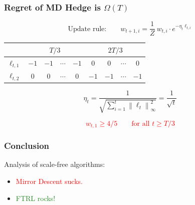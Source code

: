 \documentclass[usenames,dvipsnames]{beamer}
\newcommand{\norm}[1]{\left\|#1\right\|}
\begin{document}
\begin{frame}
\frametitle{Regret of MD Hedge is $\Omega(T)$}

$$
\text{Update rule:} \qquad w_{t+1,i} = \frac{1}{Z} \ w_{t,i} \cdot e^{-\eta_t \ell_{t,i}}
$$

\pause
\vspace{1cm}

\begin{tabular}{|c|c|c|c|c|c|c|c|c|}
\hline
&  \multicolumn{4}{|c}{$T/3$} & \multicolumn{4}{|c|}{$2T/3$} \\
\hline
$\ell_{t,1}$ & $-1$ & $-1$ & $\cdots$ & $-1$ & $0$ & $0$ & $\cdots$ & $0$ \\
\hline
$\ell_{t,2}$ & $0$ & $0$ & $\cdots$ & $0$ & $-1$ & $-1$ & $\cdots$ & $-1$ \\
\hline
\end{tabular}

\pause
\vspace{1cm}

$$
\eta_t = \frac{1}{\sqrt{\sum_{i=1}^t \norm{\ell_t}_\infty^2}} = \frac{1}{\sqrt{t}}
$$

\pause
\vspace{1cm}

\textcolor{red}{
$$
w_{t,1} \ge 4/5 \qquad \text{for all $t \ge T/3$}
$$
}

\end{frame}

\begin{frame}
\frametitle{Conclusion}

\Large

Analysis of scale-free algorithms:
\vspace{1cm}

\begin{itemize}
\item \textcolor{red}{
Mirror Descent sucks.
}

\pause
\vspace{0.5cm}

\item
\textcolor{ForestGreen}{
FTRL rocks!
}
\end{itemize}

\end{frame}
\end{document}
